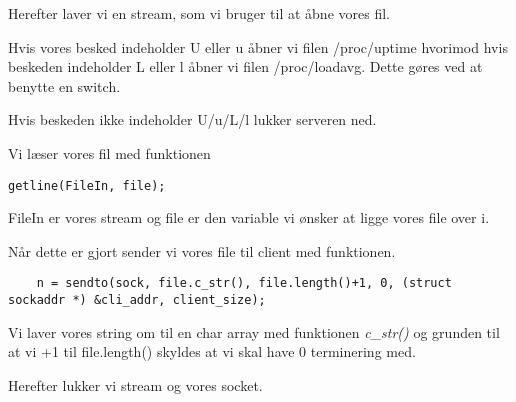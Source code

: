 Herefter laver vi en stream, som vi bruger til at åbne vores fil.

Hvis vores besked indeholder U eller u åbner vi filen /proc/uptime hvorimod hvis beskeden indeholder L eller l åbner vi filen /proc/loadavg. Dette gøres ved at benytte en switch. 

Hvis beskeden ikke indeholder U/u/L/l lukker serveren ned. 

Vi læser vores fil med funktionen

\begin{lstlisting}
getline(FileIn, file);
\end{lstlisting}

FileIn er vores stream og file er den variable vi ønsker at ligge vores file over i. 

Når dette er gjort sender vi vores file til client med funktionen. 
\begin{lstlisting}
	n = sendto(sock, file.c_str(), file.length()+1, 0, (struct sockaddr *) &cli_addr, client_size);
\end{lstlisting}

Vi laver vores string om til en char array med funktionen \textit{c\_str()} og grunden til at vi +1 til file.length() skyldes at vi skal have 0 terminering med. 

Herefter lukker vi stream og vores socket. 




